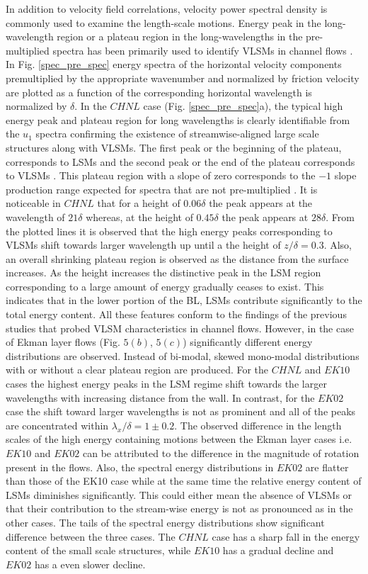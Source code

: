 \documentclass{svjour3}                     %
\begin{document}
In addition to velocity field correlations, velocity power spectral density is commonly used to examine the length-scale motions. Energy peak in the  long-wavelength region or a plateau region in the long-wavelengths in the pre-multiplied spectra has been primarily used to identify VLSMs in channel flows \citep{guala_adrian_jfm2006, fang2015blm}. In Fig. \ref{spec_pre_spec} energy spectra of the horizontal velocity components premultiplied by the appropriate wavenumber and normalized by friction velocity are plotted as a function of the corresponding horizontal wavelength is normalized by $\delta$.  In the $CHNL$ case (Fig. \ref{spec_pre_spec}a), the typical high energy peak and plateau region for long wavelengths is clearly identifiable from the $u_1$ spectra confirming the existence of streamwise-aligned large scale structures along with VLSMs. The first peak or the beginning of the plateau, corresponds to LSMs and the second peak or the end of the plateau corresponds to VLSMs \citep{kim_adrian_pof99}. This plateau region with a slope of zero  corresponds to the $-1$ slope production range expected for spectra that are not pre-multiplied \citep{perry_chng_jfm_86,saddoughi1994}. It is noticeable in $CHNL$  that for a height of $0.06\delta$ the peak appears at the wavelength of $21\delta$ whereas, at the height of $0.45\delta$ the peak appears at $28\delta$. From the plotted lines it is observed that the high energy peaks corresponding to VLSMs shift towards larger wavelength up until a the height of $z/\delta = 0.3$. Also, an overall shrinking plateau region is observed as the distance from the surface increases. As the height increases the distinctive peak in the LSM region corresponding to a large amount of energy gradually ceases to exist. This indicates that in the lower portion of the BL, LSMs contribute significantly to the total energy content. All these features conform to the findings of the previous studies that probed  VLSM characteristics in channel flows. However, in the case of Ekman layer flows (Fig. $5(b)$, $5(c)$)  significantly  different energy distributions are observed. Instead of bi-modal, skewed mono-modal distributions with or without a clear plateau region are produced. For the $CHNL$ and $EK10$ cases the highest energy peaks in the LSM regime shift towards the larger wavelengths with increasing distance from the wall. In contrast, for the $EK02$ case the shift toward  larger wavelengths is not as prominent and all of the peaks are concentrated within $\lambda_x/\delta=1 \pm 0.2$. The observed difference in the length scales of the high energy containing motions between the Ekman layer cases i.e. $EK10$ and $EK02$ can be attributed to the difference in the magnitude of rotation present in the flows. Also, the spectral energy distributions in $EK02$  are flatter than those of the EK10 case while at the same time the relative energy content of LSMs diminishes significantly. This could either mean the absence of VLSMs or that their contribution to the stream-wise energy is not as pronounced as in the other cases. The tails of the spectral energy distributions show significant difference between the three cases. The $CHNL$ case has a sharp fall in the energy content of the small scale structures, while $EK10$ has  a gradual decline and $EK02$ has a even slower decline. 
\end{document}
